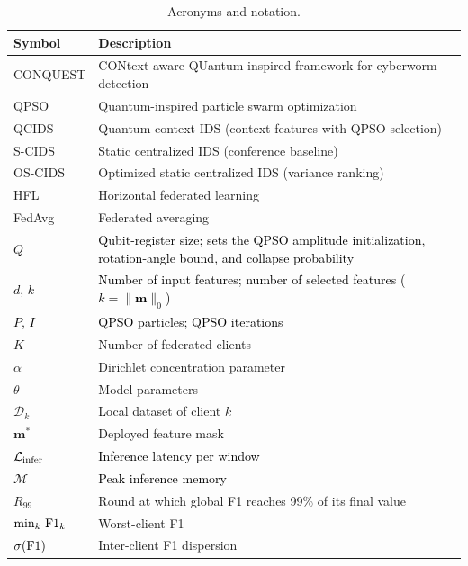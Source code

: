 \documentclass[conference]{IEEEtran}
\begin{document}
\begin{table}[!t]
\centering
\scriptsize
\caption{Acronyms and notation.}
\label{tab:acronyms_notations}
\setlength{\tabcolsep}{4pt}
\renewcommand{\arraystretch}{1.05}
\begin{tabular}{p{1.8cm} p{5.2cm}}
\hline\toprule
\textbf{Symbol} & \textbf{Description} \\
\hline\toprule
CONQUEST  & CONtext-aware QUantum-inspired framework for cyberworm detection \\
QPSO      & Quantum-inspired particle swarm optimization \\
QCIDS     & Quantum-context IDS (context features with QPSO selection) \\
S-CIDS    & Static centralized IDS (conference baseline) \\
OS-CIDS   & Optimized static centralized IDS (variance ranking) \\
HFL       & Horizontal federated learning \\
FedAvg    & Federated averaging \\
\midrule
$Q$                     & \textcolor{black}{Qubit-register size; sets the
                          QPSO amplitude initialization, rotation-angle
                          bound, and collapse probability} \\
\textcolor{black}{$d$, $k$} & \textcolor{black}{Number of input features; number
                          of selected features ($k=\|\mathbf{m}\|_0$)} \\
\textcolor{black}{$P$, $I$} & \textcolor{black}{QPSO particles; QPSO iterations} \\
$K$                     & Number of federated clients \\
$\alpha$                & Dirichlet concentration parameter \\
$\theta$                & Model parameters \\
$\mathcal{D}_k$         & Local dataset of client $k$ \\
$\mathbf{m}^{*}$        & Deployed feature mask \\
\textcolor{black}{$\mathcal{L}_{\rm infer}$} & \textcolor{black}{Inference latency per window} \\
\textcolor{black}{$\mathcal{M}$} & \textcolor{black}{Peak inference memory} \\
$R_{99}$                & Round at which global F1 reaches 99\% of its final value \\
$\min_k\,{\rm F1}_k$    & Worst-client F1 \\
$\sigma({\rm F1})$      & Inter-client F1 dispersion \\
\hline\toprule
\end{tabular}
\end{table}
\end{document}
